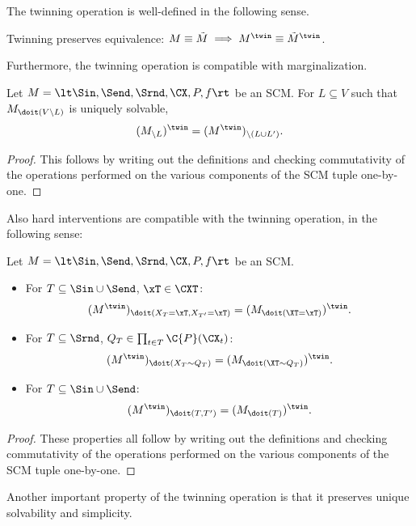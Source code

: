 The twinning operation is well-defined in the following sense.
\begin{Prp}\label{prp:twinning_preserves_scm_equivalence}
  Twinning preserves equivalence: $M \equiv \tilde{M} \implies M^\twin \equiv \tilde{M}^\twin$.
\end{Prp}
Furthermore, the twinning operation is compatible with marginalization.
\begin{Prp}\label{prp:twinning_marginalization_commute}
Let $M = \lt \Sin, \Send, \Srnd, \CX, P, f \rt$ be an SCM.
For $L \subseteq V$ such that $M_{\doit(V\setminus L)}$ is uniquely solvable,
$$(M_{\setminus L})^\twin = (M^\twin)_{\setminus (L\cup L')}.$$
\end{Prp}
\begin{proof}
  This follows by writing out the definitions and checking commutativity of
  the operations performed on the various components of the SCM tuple one-by-one.
\end{proof}
Also hard interventions are compatible with the twinning operation, in the following sense:
\begin{Prp}
Let $M = \lt \Sin, \Send, \Srnd, \CX, P, f \rt$ be an SCM.
\begin{itemize}
  \item For $T \subseteq \Sin \cup \Send$, $\xT \in \CXT$:
    $$(M^\twin)_{\doit(X_T=\xT,X_{T'}=\xT)} = (M_{\doit(\XT=\xT)})^\twin.$$
  \item For $T \subseteq \Srnd$, $Q_T \in \prod_{t\in T} \C{P}(\CX_t)$:
    $$(M^\twin)_{\doit(X_T\sim Q_T)} = (M_{\doit(\XT\sim Q_T)})^\twin.$$
  \item For $T \subseteq \Sin \cup \Send$:
    $$(M^\twin)_{\doit(T,T')} = (M_{\doit(T)})^\twin.$$
\end{itemize}
\end{Prp}
\begin{proof}
  These properties all follow by writing out the definitions and checking commutativity of
  the operations performed on the various components of the SCM tuple one-by-one.
\end{proof}
Another important property of the twinning operation is that it preserves unique solvability and simplicity.
